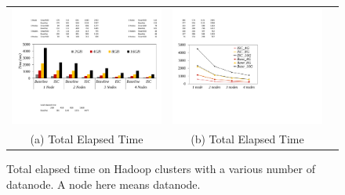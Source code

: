\begin{figure}[t]
  \centering
  \renewcommand{\tabcolsep}{2mm}
  \begin{tabular}{ccc}
 \includegraphics[width=1.25\columnwidth]{figures/Hadoop_total_execution_time_clusters.pdf}&
  \includegraphics[width=0.75\columnwidth]{figures/Hadoop_total_execution_time_clusters_line.pdf}\\
  (a) Total Elapsed Time & (b) Total Elapsed Time 
\end{tabular}
  \caption{Total elapsed time on Hadoop clusters with a various number of datanode. A node here means datanode.}
  \label{fig:total_time_on_clusters}
\end{figure}




